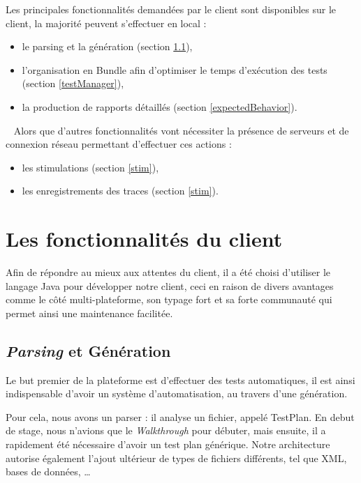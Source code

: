 Les principales fonctionnalités demandées par le client sont disponibles sur le client, la majorité peuvent s'effectuer en local : 
\begin{itemize}
	\item le parsing et la génération (section \ref{generation}),
	\item l'organisation en Bundle afin d'optimiser le temps d'exécution des tests (section \ref{testManager}),
	\item la production de rapports détaillés (section \ref{expectedBehavior}).
\end{itemize}~\newline
Alors que d'autres fonctionnalités vont nécessiter la présence de serveurs et de connexion réseau permettant d'effectuer ces actions
: 
\begin{itemize}
	\item les stimulations (section \ref{stim}),
	\item les enregistrements des traces (section \ref{stim}).
\end{itemize}
\vspace{-10px}
\section{Les fonctionnalités du client}
Afin de répondre au mieux aux attentes du client, il a été choisi d'utiliser le langage Java pour développer notre client, ceci en raison de
divers avantages comme le côté multi-plateforme, son typage fort et sa forte communauté qui permet ainsi une maintenance facilitée. 

\subsection{\textit{Parsing} et Génération}\label{generation}
Le but premier de la plateforme est d'effectuer des tests automatiques, il est ainsi indispensable d'avoir un système d'automatisation, au travers d'une génération.

Pour cela, nous avons un parser : il analyse un fichier, appelé TestPlan. En debut de stage, nous n'avions que le \textit{Walkthrough} pour débuter, mais ensuite, il a rapidement été nécessaire d'avoir un test plan générique. Notre architecture autorise également l'ajout ultérieur de types de fichiers différents, tel que XML, bases de données, \ldots 

